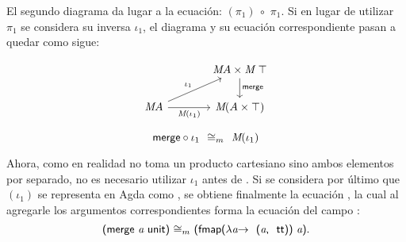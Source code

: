 El segundo diagrama da lugar a la ecuación: $(\pi_1) \ \circ$   $\pi_1$. Si en lugar de utilizar $\pi_1$ se considera su inversa $\iota_1$, el diagrama y su ecuación correspondiente pasan a quedar como sigue:
\vspace{-1.25\baselineskip}

\begin{multicols}{2}
\begin{equation}\label{diagrama3}
\begin{tikzcd}[column sep = large]
& \AgdaBound{M} A \times \AgdaBound{M} \ \AgdaDatatype{$\top$} \arrow[d, "\AgdaField{merge}"]  \\
\AgdaBound{M} A \arrow[ur, "\iota_1"] \arrow{r}[below]{\AgdaBound{M}(\iota_1)} & \AgdaBound{M} (A \times \AgdaDatatype{$\top$}) 
\end{tikzcd}
\end{equation}

\begin{equation}
\AgdaField{merge} \circ \iota_1 \ \ \AgdaField{$\cong_m$} \ \ \AgdaBound{M} (\iota_1) 
\end{equation}
\end{multicols}

Ahora, como en realidad  no toma un producto cartesiano sino ambos elementos por separado, no es necesario utilizar $\iota_1$ antes de . Si se considera por último que $(\iota_1)$ se representa en Agda como  \AgdaSymbol{($\lambda$}  \AgdaSymbol{$\rightarrow$ \ (} \AgdaSymbol{))}, se obtiene finalmente la ecuación    \AgdaSymbol{($\lambda$}  \AgdaSymbol{$\rightarrow$ \ (} \AgdaSymbol{))}, la cual al agregarle los argumentos correspondientes forma la ecuación del campo :  
\begin{equation*}
\AgdaSymbol{(}\AgdaField{merge} \ \AgdaBound{a} \ \AgdaField{unit}\AgdaSymbol{)} \   \AgdaField{$\cong_m$} \ \AgdaSymbol{(}\AgdaField{fmap} \AgdaSymbol{($\lambda$} \AgdaBound{a} \AgdaSymbol{$\rightarrow$ \ (}\AgdaBound{a} \AgdaInductiveConstructor{, \ tt} \AgdaSymbol{))} \ \AgdaBound{a}\AgdaSymbol{)}.
\end{equation*}

